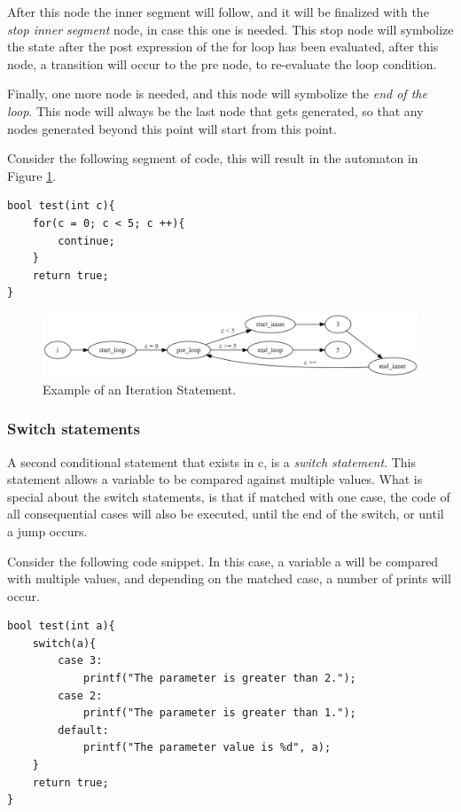 \documentclass[12pt]{article}
\begin{document}
After this node the inner segment will follow, and it will be finalized with the \textit{stop inner segment} node, in case this one is needed. This stop node will symbolize the state after the post expression of the for loop has been evaluated, after this node, a transition will occur to the pre node, to re-evaluate the loop condition.

Finally, one more node is needed, and this node will symbolize the \textit{end of the loop}. This node will always be the last node that gets generated, so that any nodes generated beyond this point will start from this point.

Consider the following segment of code, this will result in the automaton in Figure \ref{fig:test_counter_automaton}.
\begin{lstlisting}[style=CStyle]
bool test(int c){
	for(c = 0; c < 5; c ++){
		continue;
	}
	return true;
}
\end{lstlisting}

\begin{figure}[h]
	\centering
	\includegraphics[width=0.95\linewidth]{test_counter_automaton}
	\caption{Example of an Iteration Statement.}
	\label{fig:test_counter_automaton}
\end{figure}

\subsubsection{Switch statements}
A second conditional statement that exists in c, is a \textit{switch statement}. This statement allows a variable to be compared against multiple values. What is special about the switch statements, is that if matched with one case, the code of all consequential cases will also be executed, until the end of the switch, or until a jump occurs.

Consider the following code snippet. In this case, a variable a will be compared with multiple values, and depending on the matched case, a number of prints will occur.

\begin{lstlisting}[style=CStyle]
bool test(int a){
	switch(a){
		case 3:
			printf("The parameter is greater than 2.");
		case 2:
			printf("The parameter is greater than 1.");
		default:
			printf("The parameter value is %d", a);
	}
	return true;
}
\end{lstlisting}
\end{document}

